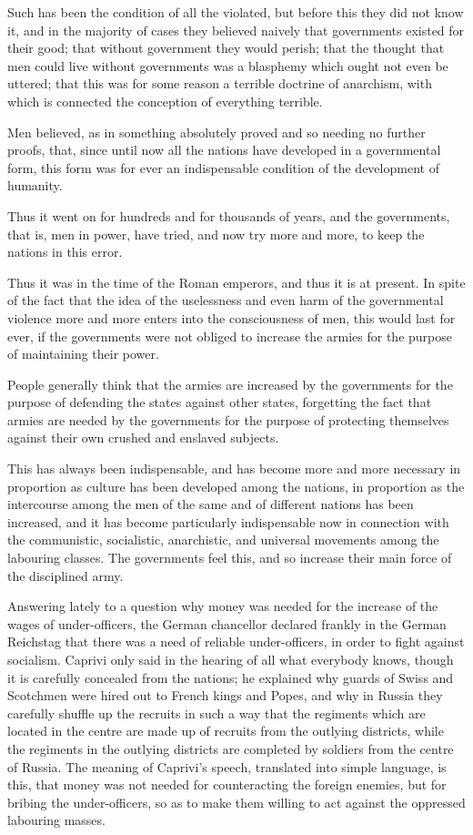 \documentclass{book}
\begin{document}
Such has been the condition of all the violated, but before this they did not know it, and in the majority of cases they believed naively that governments existed for their good; that without government they would perish; that the thought that men could live without governments was a blasphemy which ought not even be uttered; that this was for some reason a terrible doctrine of anarchism, with which is connected the conception of everything terrible.

Men believed, as in something absolutely proved and so needing no further proofs, that, since until now all the nations have developed in a governmental form, this form was for ever an indispensable condition of the development of humanity.

Thus it went on for hundreds and for thousands of years, and the governments, that is, men in power, have tried, and now try more and more, to keep the nations in this error.

Thus it was in the time of the Roman emperors, and thus it is at present. In spite of the fact that the idea of the uselessness and even harm of the governmental violence more and more enters into the consciousness of men, this would last for ever, if the governments were not obliged to increase the armies for the purpose of maintaining their power.

People generally think that the armies are increased by the governments for the purpose of defending the states against other states, forgetting the fact that armies are needed by the governments for the purpose of protecting themselves against their own crushed and enslaved subjects.

This has always been indispensable, and has become more and more necessary in proportion as culture has been developed among the nations, in proportion as the intercourse among the men of the same and of different nations has been increased, and it has become particularly indispensable now in connection with the communistic, socialistic, anarchistic, and universal movements among the labouring classes. The governments feel this, and so increase their main force of the disciplined army.\footnotemark[1]

Answering lately to a question why money was needed for the increase of the wages of under-officers, the German chancellor declared frankly in the German Reichstag that there was a need of reliable under-officers, in order to fight against socialism. Caprivi only said in the hearing of all what everybody knows, though it is carefully concealed from the nations; he explained why guards of Swiss and Scotchmen were hired out to French kings and Popes, and why in Russia they carefully shuffle up the recruits in such a way that the regiments which are located in the centre are made up of recruits from the outlying districts, while the regiments in the outlying districts are completed by soldiers from the centre of Russia. The meaning of Caprivi’s speech, translated into simple language, is this, that money was not needed for counteracting the foreign enemies, but for bribing the under-officers, so as to make them willing to act against the oppressed labouring masses.
\end{document}
